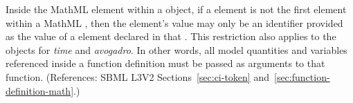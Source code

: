 Inside the  MathML element within a \FunctionDefinition
object, if a  element is not the first element within a MathML
, then the  element's value may only be an
identifier provided as the value of a  element declared in that
.  This restriction also applies to the 
objects for \emph{time} and \emph{avogadro}.  In other words, all model
quantities and variables referenced inside a function definition must be
passed as arguments to that function.  (References: SBML L3V2
Sections~\ref{sec:ci-token} and~\ref{sec:function-definition-math}.)
